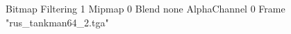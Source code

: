 {Bitmap
	{Filtering 1}
	{Mipmap 0}
	{Blend none}
	{AlphaChannel 0}
	{Frame "rus_tankman64_2.tga"}
}
